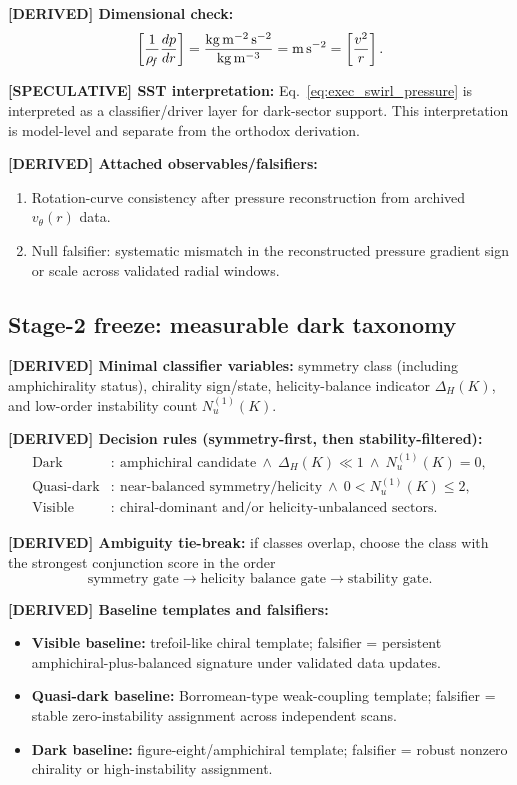 \textbf{[DERIVED] Dimensional check:}
\[
\left[\frac{1}{\rho_{\!f}}\frac{dp}{dr}\right]
=
\frac{\mathrm{kg\,m^{-2}\,s^{-2}}}{\mathrm{kg\,m^{-3}}}
=
\mathrm{m\,s^{-2}}
=
\left[\frac{v^2}{r}\right].
\]

\textbf{[SPECULATIVE] SST interpretation:}
Eq.~\eqref{eq:exec_swirl_pressure} is interpreted as a classifier/driver layer for dark-sector support. This interpretation is model-level and separate from the orthodox derivation.

\textbf{[DERIVED] Attached observables/falsifiers:}
\begin{enumerate}
    \item Rotation-curve consistency after pressure reconstruction from archived $v_\theta(r)$ data.
    \item Null falsifier: systematic mismatch in the reconstructed pressure gradient sign or scale across validated radial windows.
\end{enumerate}

\subsection{Stage-2 freeze: measurable dark taxonomy}
\textbf{[DERIVED] Minimal classifier variables:}
symmetry class (including amphichirality status), chirality sign/state, helicity-balance indicator $\Delta_H(K)$, and low-order instability count $N_u^{(1)}(K)$.

\textbf{[DERIVED] Decision rules (symmetry-first, then stability-filtered):}
\begin{align}
    \text{Dark}
    &:\ \text{amphichiral candidate}
    \ \wedge\
    \Delta_H(K)\ll 1
    \ \wedge\
    N_u^{(1)}(K)=0,\\
    \text{Quasi-dark}
    &:\ \text{near-balanced symmetry/helicity}
    \ \wedge\
    0 < N_u^{(1)}(K)\le 2,\\
    \text{Visible}
    &:\ \text{chiral-dominant and/or helicity-unbalanced sectors}.
\end{align}

\textbf{[DERIVED] Ambiguity tie-break:}
if classes overlap, choose the class with the strongest conjunction score in the order
\[
\text{symmetry gate} \rightarrow \text{helicity balance gate} \rightarrow \text{stability gate}.
\]

\textbf{[DERIVED] Baseline templates and falsifiers:}
\begin{itemize}
    \item \textbf{Visible baseline:} trefoil-like chiral template; falsifier = persistent amphichiral-plus-balanced signature under validated data updates.
    \item \textbf{Quasi-dark baseline:} Borromean-type weak-coupling template; falsifier = stable zero-instability assignment across independent scans.
    \item \textbf{Dark baseline:} figure-eight/amphichiral template; falsifier = robust nonzero chirality or high-instability assignment.
\end{itemize}

